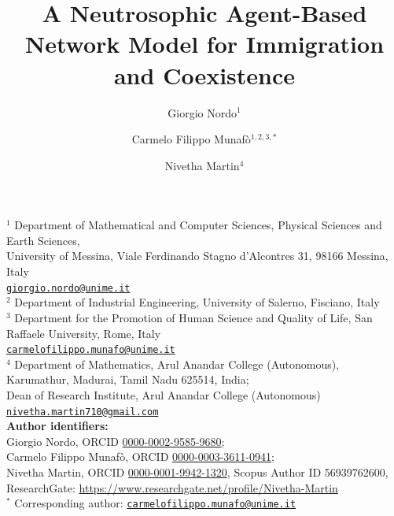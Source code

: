 \documentclass[11pt,a4paper]{article}
\title{\textbf{A Neutrosophic Agent-Based Network Model for Immigration and Coexistence}}
\author{Giorgio Nordo$^{1}$ \and Carmelo Filippo Munaf\`o$^{1,2,3,*}$ \and Nivetha Martin$^{4}$}
\date{}
\newcommand{\email}[1]{\texttt{\small \href{mailto:#1}{#1}}} %
\begin{document}
	\maketitle
	
	\begin{center}
\small
$^1$ Department of Mathematical and Computer Sciences, Physical Sciences and Earth Sciences,\\
University of Messina, Viale Ferdinando Stagno d'Alcontres 31, 98166 Messina, Italy\\
\email{giorgio.nordo@unime.it}\\[1mm]
$^2$ Department of Industrial Engineering, University of Salerno, Fisciano, Italy\\
$^3$ Department for the Promotion of Human Science and Quality of Life, San Raffaele University, Rome, Italy\\
\email{carmelofilippo.munafo@unime.it}\\[1mm]
$^4$ Department of Mathematics, Arul Anandar College (Autonomous), Karumathur, Madurai, Tamil Nadu 625514, India;\\
Dean of Research Institute, Arul Anandar College (Autonomous)\\
\email{nivetha.martin710@gmail.com}\\[2mm]
\textbf{Author identifiers:}\\
Giorgio Nordo, ORCID \href{https://orcid.org/0000-0002-9585-9680}{0000-0002-9585-9680};\\
Carmelo Filippo Munaf\`o, ORCID \href{https://orcid.org/0000-0003-3611-0941}{0000-0003-3611-0941};\\
Nivetha Martin, ORCID \href{https://orcid.org/0000-0001-9942-1320}{0000-0001-9942-1320}, Scopus Author ID 56939762600,\\
ResearchGate: \url{https://www.researchgate.net/profile/Nivetha-Martin}\\[2mm]
$^{*}$ Corresponding author: \email{carmelofilippo.munafo@unime.it}
\end{center}
	
\end{document}
